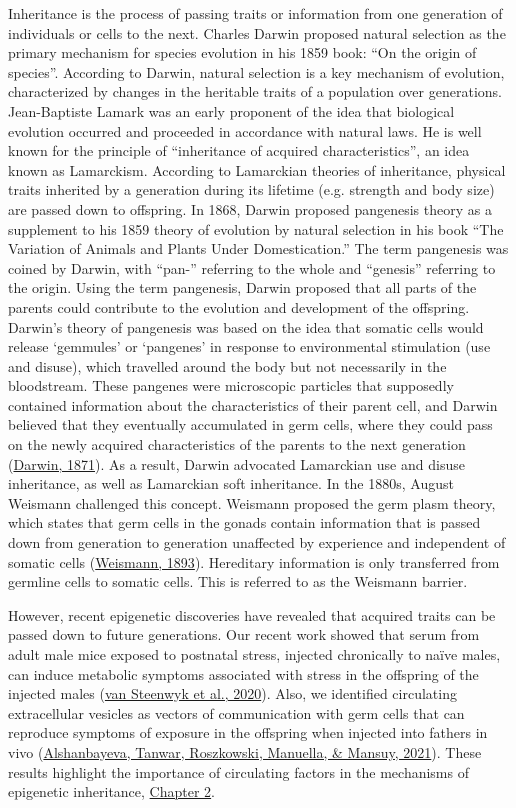 \documentclass[12pt,twoside]{reedthesis}
\begin{document}
Inheritance is the process of passing traits or information from one
generation of individuals or cells to the next. Charles Darwin proposed
natural selection as the primary mechanism for species evolution in his
1859 book: ``On the origin of species''. According to Darwin, natural
selection is a key mechanism of evolution, characterized by changes in
the heritable traits of a population over generations. Jean-Baptiste
Lamark was an early proponent of the idea that biological evolution
occurred and proceeded in accordance with natural laws. He is well known
for the principle of ``inheritance of acquired characteristics'', an idea
known as Lamarckism. According to Lamarckian theories of inheritance,
physical traits inherited by a generation during its lifetime (e.g.
strength and body size) are passed down to offspring. In 1868, Darwin
proposed pangenesis theory as a supplement to his 1859 theory of
evolution by natural selection in his book ``The Variation of Animals and
Plants Under Domestication.'' The term pangenesis was coined by Darwin,
with ``pan-'' referring to the whole and ``genesis'' referring to the
origin. Using the term pangenesis, Darwin proposed that all parts of the
parents could contribute to the evolution and development of the
offspring. Darwin's theory of pangenesis was based on the idea that
somatic cells would release `gemmules' or `pangenes' in response to
environmental stimulation (use and disuse), which travelled around the
body but not necessarily in the bloodstream. These pangenes were
microscopic particles that supposedly contained information about the
characteristics of their parent cell, and Darwin believed that they
eventually accumulated in germ cells, where they could pass on the newly
acquired characteristics of the parents to the next generation
(\protect\hyperlink{ref-darwin1871}{Darwin, 1871}). As a result, Darwin advocated Lamarckian use and disuse
inheritance, as well as Lamarckian soft inheritance. In the 1880s,
August Weismann challenged this concept. Weismann proposed the germ
plasm theory, which states that germ cells in the gonads contain
information that is passed down from generation to generation unaffected
by experience and independent of somatic cells (\protect\hyperlink{ref-weismann1893}{Weismann, 1893}).
Hereditary information is only transferred from germline cells to
somatic cells. This is referred to as the Weismann barrier.

However, recent epigenetic discoveries have revealed that acquired
traits can be passed down to future generations. Our recent work showed
that serum from adult male mice exposed to postnatal stress, injected
chronically to naïve males, can induce metabolic symptoms associated with
stress in the offspring of the injected males (\protect\hyperlink{ref-vansteenwyk2020}{van Steenwyk et al., 2020}). Also,
we identified circulating extracellular vesicles as vectors of
communication with germ cells that can reproduce symptoms of exposure in
the offspring when injected into fathers in vivo (\protect\hyperlink{ref-alshanbayeva2021}{Alshanbayeva, Tanwar, Roszkowski, Manuella, \& Mansuy, 2021}).
These results highlight the importance of circulating factors in the
mechanisms of epigenetic inheritance, \protect\hyperlink{chapter2}{Chapter 2}.
\end{document}
